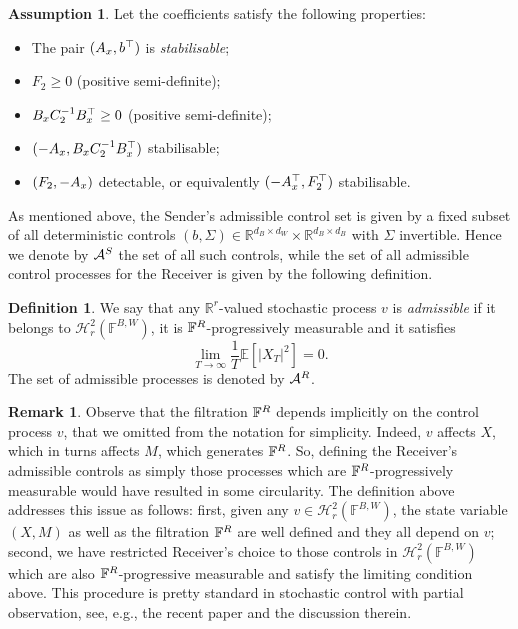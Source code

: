 \documentclass[a4paper,10pt]{article}
\newcommand{\RR}{\mathbb{R}}
\theoremstyle{definition}
\newtheorem{definition}[theorem]{Definition}
\newtheorem{remark}[theorem]{Remark}
\newtheorem{assumption}[theorem]{Assumption}
\theoremstyle{plain}
\numberwithin{equation}{section}
\begin{document}
\begin{assumption}\label{ass_coeff} Let the coefficients satisfy the following properties:
	\begin{itemize}
		\item[i)] The pair $(A_{\rm x}, b^\top)$ is {\em{stabilisable}};
		\item[ii)] $F_2 \ge 0$ (positive semi-definite);
		\item[iii)] $ B_{\rm x} C_2^{-1} B_{\rm x}^\top \ge 0$ (positive semi-definite);
		\item[iv)] $(-A_{\rm x}, B_{\rm x} C_2^{-1} B_{\rm x}^\top)$ stabilisable;
		\item[v)] $(F_2,-A_{\rm x})$ detectable, or equivalently $(-A_{\rm x}^\top,F_2^\top)$ stabilisable.
	\end{itemize}
\end{assumption}

As mentioned above, the Sender's admissible control set is given by a fixed subset of all deterministic controls $(b,\Sigma) \in \RR^{d_B \times d_W} \times \RR^{d_B \times d_B}$ with $\Sigma$ invertible. Hence we denote by $\mathcal A^{\rm S}$ the set of all such controls,
while the set of all admissible control processes for the Receiver is given by the following definition.

\begin{definition}\label{adm-case1} 
    We say that any $\RR^r$-valued stochastic process $v$ is \emph{admissible} if it belongs to $\mathcal H_r ^2(\mathbb F^{B,W})$, it is $\mathbb F^{\rm R}$-progressively measurable and it satisfies
    \[ \lim_{T \to \infty} \frac{1}{T} \mathbb E[ |X_T |^2] =0. \]
   The set of admissible processes is denoted by $\mathcal A^{\rm R}$.
   \end{definition}

\begin{remark}
Observe that the filtration $\mathbb F^{\rm R}$ depends implicitly on the control process $v$, that we omitted from the notation for simplicity. Indeed, $v$ affects $X$, which in turns affects $M$, which generates $\mathbb F^{\rm R}$. So, defining the Receiver's admissible controls as simply those processes which are $\mathbb F^{\rm R}$-progressively measurable would have resulted in some circularity. The definition above addresses this issue as follows: first, given any $v \in \mathcal H_r ^2(\mathbb F^{B,W})$, the state variable $(X,M)$ as well as the filtration $\mathbb F^{\rm R}$ are well defined and they all depend on $v$; second, we have restricted Receiver's choice to those controls in $\mathcal H_r ^2(\mathbb F^{B,W})$ which are also $\mathbb F^{\rm R}$-progressive measurable and satisfy the limiting condition above. This procedure is pretty standard in stochastic control with partial observation, see, e.g., the recent paper \cite{cohen25} and the discussion therein. \end{remark}
\end{document}
